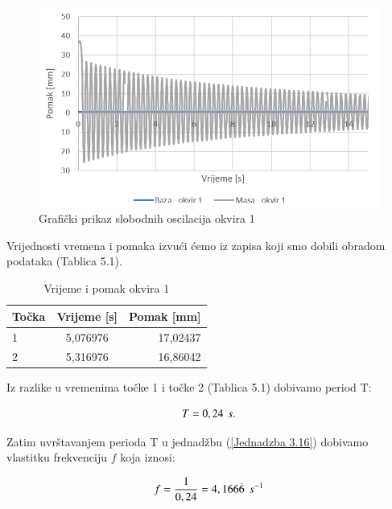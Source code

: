 \documentclass[12pt]{book}
\begin{document}
\begin{figure}[h]
	\centering
	\includegraphics[width=1\linewidth]{Slike/slobodne_oscilacije_o1}
	\caption{Grafički prikaz slobodnih oscilacija okvira 1}
	\label{fig:slobodneoscilacijeo1}
\end{figure}

Vrijednosti vremena i pomaka izvući ćemo iz zapisa koji smo dobili obradom podataka (Tablica 5.1).

\begin{table}[H]
	\label{table3}
	\begin{center}
		\begin{tabular}{|l|c|r|}
			\hline
			Točka & Vrijeme [s] & Pomak [mm]\\
			\hline
			1 & 5,076976 & 17,02437\\
			\hline
			2 & 5,316976 & 16,86042\\
			\hline
		\end{tabular}
	\end{center}
	\caption{Vrijeme i pomak okvira 1}
\end{table}

Iz razlike u vremenima točke 1 i točke 2 (Tablica 5.1) dobivamo period T:

\begin{equation}\label{Jednadzba 5.4}
	T = 0,24 \hspace{0.15cm} s.
\end{equation}

Zatim uvrštavanjem perioda T u jednadžbu (\ref{Jednadzba 3.16}) dobivamo vlastitku frekvenciju $f$ koja iznosi:

\begin{equation}\label{Jednadzba 5.5}
	f = \frac{1}{0,24} = 4,166\dot{6} \hspace{0.15cm} s^{-1}
\end{equation}
\end{document}
